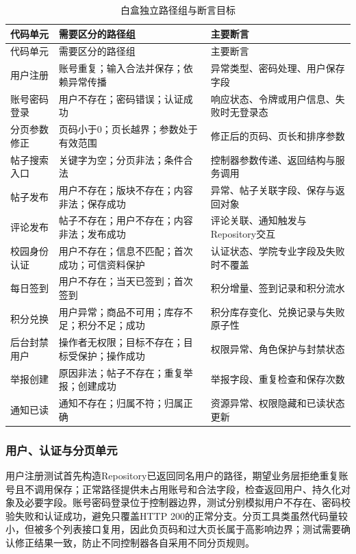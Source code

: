 \documentclass[bwprint]{report}
\begin{document}
\begin{longtable}{P{3.0cm}P{4.5cm}P{5.6cm}}
\caption{白盒独立路径组与断言目标}\label{tab:whitebox-paths}\\
\toprule
代码单元 & 需要区分的路径组 & 主要断言 \\
\midrule
\endfirsthead
\toprule
代码单元 & 需要区分的路径组 & 主要断言 \\
\midrule
\endhead
用户注册 & 账号重复；输入合法并保存；依赖异常传播 & 异常类型、密码处理、用户保存字段 \\
账号密码登录 & 用户不存在；密码错误；认证成功 & 响应状态、令牌或用户信息、失败时无登录态 \\
分页参数修正 & 页码小于0；页长越界；参数处于有效范围 & 修正后的页码、页长和排序参数 \\
帖子搜索入口 & 关键字为空；分页非法；条件合法 & 控制器参数传递、返回结构与服务调用 \\
帖子发布 & 用户不存在；版块不存在；内容非法；保存成功 & 异常、帖子关联字段、保存与返回对象 \\
评论发布 & 帖子不存在；用户不存在；内容非法；发布成功 & 评论关联、通知触发与Repository交互 \\
校园身份认证 & 用户不存在；信息不匹配；首次成功；可信资料保护 & 认证状态、学院专业字段及失败时不覆盖 \\
每日签到 & 用户不存在；当天已签到；首次签到 & 积分增量、签到记录和积分流水 \\
积分兑换 & 用户异常；商品不可用；库存不足；积分不足；成功 & 积分库存变化、兑换记录与失败原子性 \\
后台封禁用户 & 操作者无权限；目标不存在；目标受保护；操作成功 & 权限异常、角色保护与封禁状态 \\
举报创建 & 原因非法；帖子不存在；重复举报；创建成功 & 举报字段、重复检查和保存次数 \\
通知已读 & 通知不存在；归属不符；归属正确 & 资源异常、权限隐藏和已读状态更新 \\
\bottomrule
\end{longtable}

\subsubsection{用户、认证与分页单元}
用户注册测试首先构造Repository已返回同名用户的路径，期望业务层拒绝重复账号且不调用保存；正常路径提供未占用账号和合法字段，检查返回用户、持久化对象及必要字段。账号密码登录位于控制器边界，测试分别模拟用户不存在、密码校验失败和认证成功，避免只覆盖HTTP 200的正常分支。分页工具类虽然代码量较小，但被多个列表接口复用，因此负页码和过大页长属于高影响边界；测试需要确认修正结果一致，防止不同控制器各自采用不同分页规则。
\end{document}
